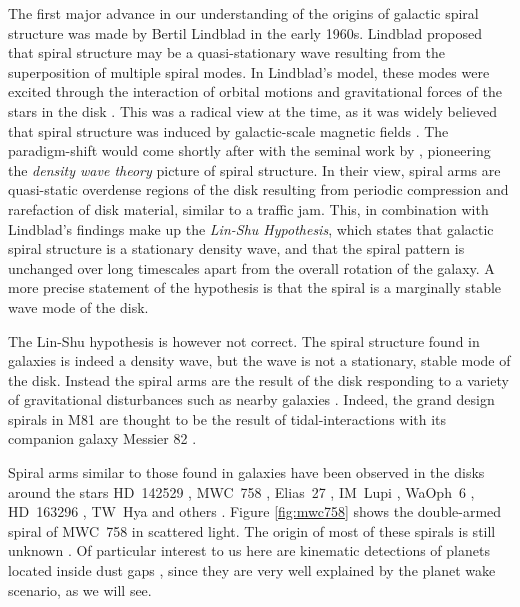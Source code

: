 The first major advance in our understanding of the origins of galactic spiral structure was made by Bertil Lindblad in the early 1960s. 
Lindblad proposed that spiral structure may be a quasi-stationary wave resulting from the superposition of multiple spiral modes.
In Lindblad's model, these modes were excited through the interaction of orbital motions and gravitational forces of the stars in the disk \citep{lindblad1963}.
This was a radical view at the time, as it was widely believed that spiral structure was induced by galactic-scale magnetic fields \citep[eg.][]{hoyle1961,oki1964}.
The paradigm-shift would come shortly after with the seminal work by \citet{lin1964}, pioneering the \textit{density wave theory} picture of spiral structure.
In their view, spiral arms are quasi-static overdense regions of the disk resulting from periodic compression and rarefaction of disk material, similar to a traffic jam.
This, in combination with Lindblad's findings make up the \textit{Lin-Shu Hypothesis}, which states that galactic spiral structure is a stationary density wave, and that the spiral pattern is unchanged over long timescales apart from the overall rotation of the galaxy.
A more precise statement of the hypothesis is that the spiral is a marginally stable wave mode of the disk.

The Lin-Shu hypothesis is however not correct.
The spiral structure found in galaxies is indeed a density wave, but the wave is not a stationary, stable mode of the disk.
Instead the spiral arms are the result of the disk responding to a variety of gravitational disturbances such as nearby galaxies \citep{goldreich1965,julian1966}.
Indeed, the grand design spirals in M81 are thought to be the result of tidal-interactions with its companion galaxy Messier 82 \citep{yun1999a}.

Spiral arms similar to those found in galaxies have been observed in the disks around the stars HD~142529 \citep{christiaens2014}, MWC~758 \citep{benisty2015}, Elias~27 \citep{perez2016,huang2018}, IM~Lupi \citep{avenhaus2018,huang2018}, WaOph~6 \citep{huang2018}, HD~163296 \citep{calcino2022}, TW~Hya \citep{teague2022} and others \citep[and references therin]{dong2018}.
Figure \ref{fig:mwc758} shows the double-armed spiral of MWC~758 in scattered light.
The origin of most of these spirals is still unknown \citep[eg.][]{zhang2018}.
Of particular interest to us here are kinematic detections of planets located inside dust gaps \citep{pinte2018a,pinte2019,pinte2020,teague2021,teague2022}, since they are very well explained by the planet wake scenario, as we will see.

